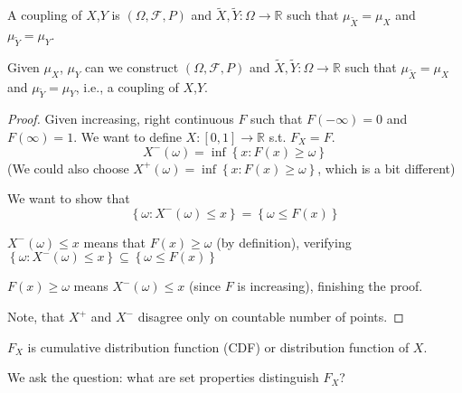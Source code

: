\begin{definition}
	A coupling of $X$,$Y$ is $(\Omega, \mathcal{F}, P)$  and $\tilde{X},\tilde{Y} : \Omega \to \mathbb{R}$  such that $\mu_{\tilde{X}} = \mu_X$ and $\mu_{\tilde{Y}}  = \mu_Y$.
\end{definition}
\begin{theorem}
	Given $\mu_X$, $\mu_Y$ can we construct $(\Omega, \mathcal{F}, P)$ and $\tilde{X},\tilde{Y} : \Omega \to \mathbb{R}$  such that $\mu_{\tilde{X}} = \mu_X$ and $\mu_{\tilde{Y}}  = \mu_Y$, i.e., a coupling of $X$,$Y$.
	\begin{proof}
		Given increasing, right continuous $F$ such that $F(-\infty)=0$ and $F(\infty) = 1$. We want to define $X: [0,1] \to \mathbb{R}$ s.t. $F_X=F$. 
		$$X^-(\omega) = \inf \left\{ x: F(x) \geq \omega \right\}$$
		(We could also choose $X^+(\omega) = \inf \left\{ x: F(x) \geq \omega \right\}$, which is a bit different)
		
		We want to show that
		$$\left\{ \omega : X^-(\omega) \leq x \right\} = \left\{ \omega \leq F(x) \right\}$$
		
		$X^-(\omega) \leq x $ means that $F(x) \geq \omega$ (by definition), verifying $\left\{ \omega : X^-(\omega) \leq x \right\} \subseteq \left\{ \omega \leq F(x) \right\}$
		
		$F(x) \geq \omega $ means $X^-(\omega)  \leq x$ (since $F$ is increasing), finishing the proof.
		
		Note, that $X^+$ and $X^-$ disagree only on countable number of points.
		
	\end{proof}
\end{theorem}
 

$F_X$ is cumulative distribution function (CDF) or distribution function of $X$.

We ask the question: what are set properties distinguish $F_X$? 
